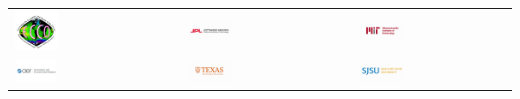 \pagebreak
\begin{center}
\begin{tabular}{m{} m{} m{} m{} m{}}
    \includegraphics[width=0.3\textwidth]{../images/ecco_logo_800_726.png} & & \includegraphics[width=0.3\textwidth]{../images/logo_jpl.png} & & \includegraphics[width=0.3\textwidth]{../images/logo_mit.png}\\ 

    \includegraphics[width=0.3\textwidth]{../images/logo_aer.png} & & \includegraphics[width=0.3\textwidth]{../images/logo_uta.png} & & \includegraphics[width=0.3\textwidth]{../images/ecco_teams_sjsu.png}\\


\end{tabular}
\end{center}
